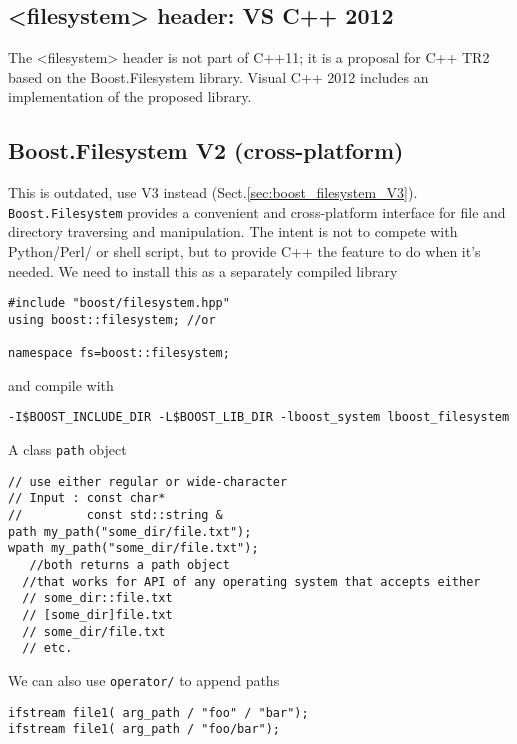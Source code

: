 \subsection{<filesystem> header: VS C++ 2012}

The <filesystem> header is not part of C++11; it is a proposal for C++ TR2 based
on the Boost.Filesystem library. Visual C++ 2012 includes an implementation of
the proposed library.


\subsection{Boost.Filesystem V2 (cross-platform)}
\label{sec:boost_filesystem_V2}

This is outdated, use V3 instead (Sect.\ref{sec:boost_filesystem_V3}).
\verb!Boost.Filesystem! provides a convenient and cross-platform interface for
file and directory traversing and manipulation. The intent is not to compete
with Python/Perl/ or shell script, but to provide C++ the feature to do when
it's needed. We need to install this as a separately compiled library
\begin{verbatim}
#include "boost/filesystem.hpp"
using boost::filesystem; //or

namespace fs=boost::filesystem;
\end{verbatim}
and compile with
\begin{verbatim}
-I$BOOST_INCLUDE_DIR -L$BOOST_LIB_DIR -lboost_system lboost_filesystem
\end{verbatim}

A class \verb!path! object
\begin{verbatim}
// use either regular or wide-character
// Input : const char* 
//         const std::string &
path my_path("some_dir/file.txt");  
wpath my_path("some_dir/file.txt"); 
   //both returns a path object 
  //that works for API of any operating system that accepts either
  // some_dir::file.txt
  // [some_dir]file.txt
  // some_dir/file.txt
  // etc.
\end{verbatim}
We can also use \verb!operator/! to append paths
\begin{verbatim}
ifstream file1( arg_path / "foo" / "bar");
ifstream file1( arg_path / "foo/bar");
\end{verbatim}

